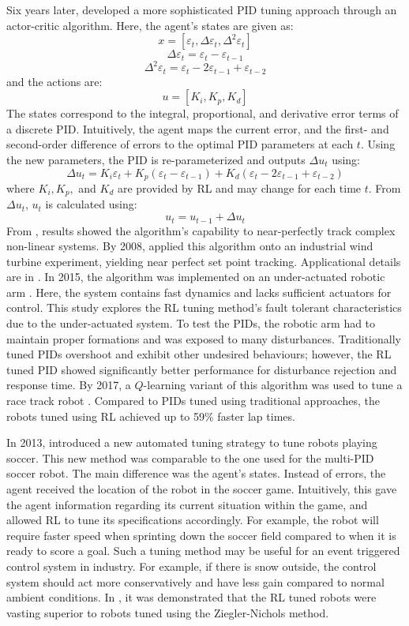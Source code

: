 Six years later, \cite{pid2} developed a more sophisticated PID tuning approach through an actor-critic algorithm.  Here, the agent's states are given as:
$$x = [\varepsilon_t, \Delta \varepsilon_t, \Delta^2 \varepsilon_t]$$
$$\Delta \varepsilon_t = \varepsilon_t - \varepsilon_{t-1}$$
$$\Delta^2 \varepsilon_t = \varepsilon_t - 2\varepsilon_{t-1} + \varepsilon_{t-2}$$
and the actions are:
$$u = [K_i, K_p, K_d]$$
The states correspond to the integral, proportional, and derivative error terms of a discrete PID. Intuitively, the agent maps the current error, and the first- and second-order difference of errors to the optimal PID parameters at each $t$. Using the new parameters, the PID is re-parameterized and outputs $\Delta u_t$ using:
\begin{equation}
    \Delta u_t = K_i \varepsilon_t + K_p (\varepsilon_t - \varepsilon_{t-1}) + K_d (\varepsilon_t - 2\varepsilon_{t-1} + \varepsilon_{t-2})
\end{equation}
where $K_i, K_p,$ and $K_d$ are provided by RL and may change for each time $t$. From $\Delta u_t$, $u_t$ is calculated using:
$$u_t = u_{t-1} + \Delta u_t$$
From \cite{pid2}, results showed the algorithm's capability to near-perfectly track complex non-linear systems. By 2008, \cite{pid3} applied this algorithm onto an industrial wind turbine experiment, yielding near perfect set point tracking.  Applicational details are in \cite{pid3}. In 2015, the algorithm was implemented on an under-actuated robotic arm \cite{pid4}. Here, the system contains fast dynamics and lacks sufficient actuators for control. This study explores the RL tuning method's fault tolerant characteristics due to the under-actuated system.  To test the PIDs, the robotic arm had to maintain proper formations and was exposed to many disturbances. Traditionally tuned PIDs overshoot and exhibit other undesired behaviours; however, the RL tuned PID showed significantly better performance for disturbance rejection and response time. By 2017, a $Q$-learning variant of this algorithm was used to tune a race track robot \cite{pid6}.  Compared to PIDs tuned using traditional approaches, the robots tuned using RL achieved up to 59\% faster lap times. 

In 2013, \cite{pid6} introduced a new automated tuning strategy to tune robots playing soccer.  This new method was comparable to the one used for the multi-PID soccer robot. The main difference was the agent's states.  Instead of errors, the agent received the location of the robot in the soccer game. Intuitively, this gave the agent information regarding its current situation within the game, and allowed RL to tune its specifications accordingly.  For example, the robot will require faster speed when sprinting down the soccer field compared to when it is ready to score a goal. Such a tuning method may be useful for an event triggered control system in industry.  For example, if there is snow outside, the control system should act more conservatively and have less gain compared to normal ambient conditions. In \cite{pid6}, it was demonstrated that the RL tuned robots were vasting superior to robots tuned using the Ziegler-Nichols method.

